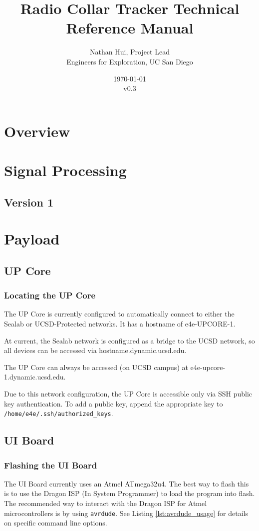 \documentclass{report}
\title{Radio Collar Tracker Technical Reference Manual}
\author{Nathan Hui, Project Lead\\Engineers for Exploration, UC San Diego}
\date{\today\\v0.3}
\begin{document}
	\maketitle
	\tableofcontents
	\listoffigures
	\listoftables
	\lstlistoflistings
	\chapter{Overview}
	\chapter{Signal Processing}
		\section{Version 1}

	\chapter{Payload}
		\section{UP Core}
			\subsection{Locating the UP Core}
				The UP Core is currently configured to automatically connect to either the Sealab or UCSD-Protected networks.  It has a hostname of e4e-UPCORE-1.

				At current, the Sealab network is configured as a bridge to the UCSD network, so all devices can be accessed via hostname.dynamic.ucsd.edu.

				The UP Core can always be accessed (on UCSD campus) at e4e-upcore-1.dynamic.ucsd.edu.

				Due to this network configuration, the UP Core is accessible only via SSH public key authentication.  To add a public key, append the appropriate key to \lstinline[language=sh]{/home/e4e/.ssh/authorized_keys}.
		\section{UI Board} \label{sec:ui}
			\subsection{Flashing the UI Board} \label{ssec:flash_ui}
				The UI Board currently uses an Atmel ATmega32u4.  The best way to flash this is to use the Dragon ISP (In System Programmer) to load the program into flash.  The recommended way to interact with the Dragon ISP for Atmel microcontrollers is by using \lstinline[language=sh]{avrdude}.  See Listing \ref{lst:avrdude_usage} for details on specific command line options.
\end{document}
